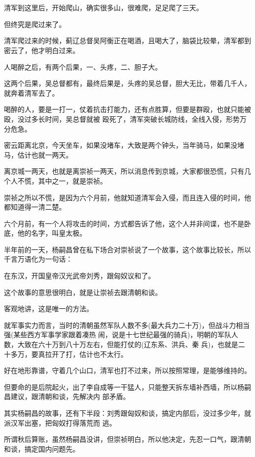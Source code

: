 \documentclass[11pt,a4paper,onecolumn]{article}
\begin{document}
\section[\thesection]{}

清军到这里后，开始爬山，确实很多山，很难爬，足足爬了三天。

但终究是爬过来了。

清军爬过来的时候，蓟辽总督吴阿衡正在喝酒，且喝大了，脑袋比较晕，清军都到密云了，他才明白过来。

人喝醉之后，有两个后果，一、头疼，二、胆子大。

这两个后果，吴总督都有，最终后果是，头疼的吴总督，胆大无比，带着几千人，就奔着清军去了。

喝醉的人，要是一打一，仗着抗击打能力，还有点胜算，但要是群殴，也就只能被殴，没过多长时间，吴总督就被
殴死了，清军突破长城防线，全线入侵，形势万分危急。

密云距离北京，今天坐车，如果没堵车，大致是两个钟头，当年骑马，如果没堵马，估计也就一两天。

离京城一两天，也就是离崇祯一两天，所以消息传到京城，大家都很恐慌，只有几个人不慌，其中之一，就是崇祯。

崇祯之所以不慌，是因为六个月前，他就知道清军会入侵，而且连入侵的时间，他都知道得一清二楚。

六个月前，有一个人将攻击的时间，方式都告诉了他，这个人并非间谍，也不是卧底，他的名字，叫皇太极。

半年前的一天，杨嗣昌曾在私下场合对崇祯说了一个故事，这个故事比较长，所以千言万语化为一句话：

在东汉，开国皇帝汉光武帝刘秀，跟匈奴议和了。

这个故事的意思很明白，就是让崇祯去跟清朝和谈。

客观地讲，这是唯一的方法。

就军事实力而言，当时的清朝虽然军队人数不多(最大兵力二十万)，但战斗力相当强(某些西方军事学家跟着凑热
闹，说是十七世纪最强的骑兵)，明朝的军队人数，大致在六十万到八十万左右，但能打仗的(辽东系、洪兵、秦
兵)，也就是二十多万，要真拉开了打，估计也不太行。

好在地形靠谱，守着几个山口，清军也打不过来，所以按照常理，是能够维持的。

但要命的是后院起火，出了李自成等一干猛人，只能整天拆东墙补西墙，所以杨嗣昌建议，跟清朝和谈，先解决内
部矛盾。

其实杨嗣昌的故事，还有下半段：刘秀跟匈奴和谈，搞定内部后，没过多少年，就派汉军出塞，把匈奴打得落荒而
逃。

所谓秋后算账，虽然杨嗣昌没讲，但崇祯明白，所以他决定，先忍一口气，跟清朝和谈，搞定国内问题先。
\end{document}
